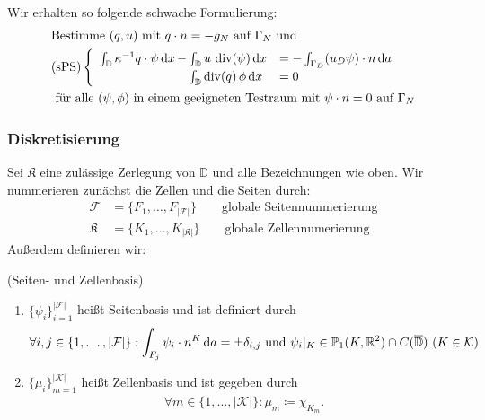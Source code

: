 Wir erhalten so folgende schwache Formulierung:
\label{sPS}
\begin{align*}
&\text{Bestimme } (q,u) \text{ mit } q\cdot n = -g_N \text{ auf } \Gamma_N \text{ und}\\
&\text{(sPS)}\begin{cases}
\begin{array}{llll}
\int_{\mathbb{D}} \kappa^{-1} q \cdot \psi \, \mathrm{d} x \, - \mkern-15mu &\int_{\mathbb{D}} u \, \operatorname{div}(\psi) \, \mathrm{d} x &= - \int_{\Gamma_D} (u_D \psi) \cdot n \, \mathrm{d} a\\
&\int_{\mathbb{D}} \operatorname{div}(q) \, \phi \, \mathrm{d} x &= 0
\end{array}
\end{cases}	\\
&\text{ für alle } (\psi, \phi) \text{ in einem geeigneten Testraum mit } \psi \cdot n = 0 \text{ auf } \Gamma_N 
\end{align*}

\subsubsection{Diskretisierung}
Sei $ \mathfrak{K}  $ eine zulässige Zerlegung von $ \mathbb{D} $ und alle Bezeichnungen wie oben.
Wir nummerieren zunächst die Zellen und die Seiten durch:
\begin{align*}
	\mathcal{F} &= \{ F_1,\dots,F_{|\mathcal{F}|}\} \qquad \text{globale Seitennummerierung} \\
	\mathfrak{K} &=  \{ K_1,\dots,K_{|\mathfrak{K}|}\} \qquad \text{globale Zellennumerierung}
\end{align*}
Außerdem definieren wir:
\begin{Definition}(Seiten- und Zellenbasis) 
	\begin{enumerate}[label=(\alph*)]
		\item $ \{ \psi_i \}_{i=1}^{|\mathcal{F}|} $ heißt Seitenbasis und ist definiert durch
			\begin{align*}
					\forall i,j \in \{1, \dots , |\mathcal{F}| \} : \int_{F_j} \psi_i \cdot n^K \, \mathrm{d} a = \pm \delta_{i,j} \text{ und }  \psi_i|_K \in \mathbb{P}_1(K,\mathbb{R}^2) \cap C(\overline{\mathbb{D}}) \ (K \in \mathcal{K}) 
			\end{align*} 
		\item $ \{ \mu_i \}_{m=1}^{|\mathcal{K}|} $ heißt Zellenbasis und ist gegeben durch
			\begin{align*}
				\forall m \in \{1, \dots , |\mathcal{K}| \} : \mu_m \coloneqq  \chi_{K_m}.
			\end{align*}
	\end{enumerate}
\end{Definition} 

